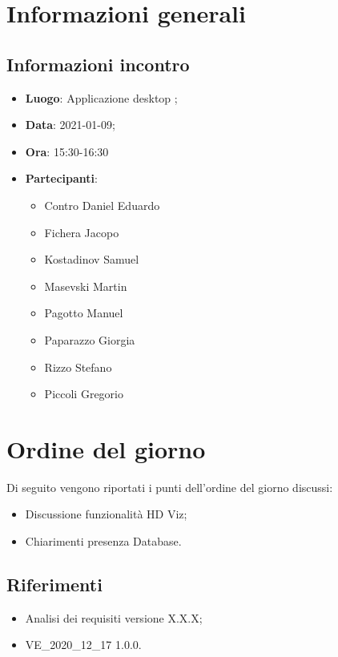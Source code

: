 \documentclass{article}
\begin{document}


\section{Informazioni generali}
\label{sec:info_generali}

\subsection{Informazioni incontro}
\label{sub:info_incontro}

\begin{itemize}
	\item \textbf{Luogo}: Applicazione desktop ;
	\item \textbf{Data}: 2021-01-09;
	\item \textbf{Ora}: 15:30-16:30
	\item \textbf{Partecipanti}:
	\begin{itemize}
		\item Contro Daniel Eduardo
		\item Fichera Jacopo
		\item Kostadinov Samuel
		\item Masevski Martin
		\item Pagotto Manuel
		\item Paparazzo Giorgia
		\item Rizzo Stefano
		\item Piccoli Gregorio
	\end{itemize}
\end{itemize}

\section{Ordine del giorno}%
\label{sec:ordine_del_giorno}

Di seguito vengono riportati i punti dell'ordine del giorno discussi:
\begin{itemize}
    \item Discussione funzionalità HD Viz;
    \item Chiarimenti presenza Database.
\end{itemize}


\subsection{Riferimenti}%
\label{sub:riferimenti}
\begin{itemize}
    \item Analisi dei requisiti versione X.X.X;
	\item VE\_2020\_12\_17 1.0.0.
\end{itemize}
\end{document}
